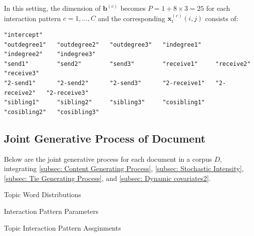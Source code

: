 \documentclass[a4paper]{article}
\begin{document}
In this setting, the dimension of  $\boldsymbol{b}^{(c)}$ becomes $P =  1 + 8 \times 3= 25$ for each interaction pattern $c=1,...,C$ and the corresponding $\boldsymbol{x}^{(c)}_{t}(i, j)$ consists of:
\begin{verbatim}
"intercept"    
"outdegree1"   "outdegree2"   "outdegree3"   "indegree1"    "indegree2"    "indegree3"   
"send1"        "send2"        "send3"        "receive1"     "receive2"     "receive3"     
"2-send1"      "2-send2"      "2-send3"      "2-receive1"   "2-receive2"   "2-receive3"  
"sibling1"     "sibling2"     "sibling3"     "cosibling1"   "cosibling2"   "cosibling3"   
\end{verbatim}
\subsection{Joint Generative Process of Document} \label{subsec: Joint Generative Process of Document}
 Below are the joint generative process for each document in a corpus $D$, integrating \ref{subsec: Content Generating Process}, \ref{subsec: Stochastic Intensity}, \ref{subsec: Tie Generating Process}, and \ref{subsec: Dynamic covariates2}.  
\begin{algorithm}[H]
	\SetAlgoLined
	\caption{Topic Word Distributions}
\end{algorithm}
\begin{algorithm}[H]
	\SetAlgoLined
	\caption{Interaction Pattern Parameters}
\end{algorithm}
\begin{algorithm}[H]
	\SetAlgoLined
	\caption{Topic Interaction Pattern Assginments}
\end{algorithm}
\end{document}
